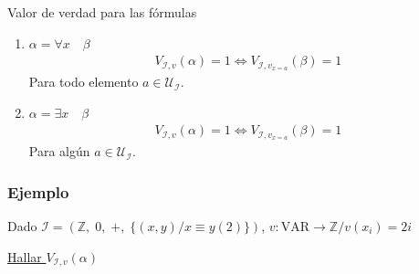 \begin{definicion}{Valor de verdad para las fórmulas}{}
\begin{enumerate}
    \item $\alpha = \forall x \quad \beta$
        \begin{gather*}
            V_{\mathcal{I}, v}(\alpha) = 1 \iff
            V_{\mathcal{I}, v_{x=a}}(\beta) = 1
        \end{gather*}
        Para todo elemento $a \in \mathcal{U}_{\mathcal{I}}$.

    \item $\alpha = \exists x \quad \beta$
        \begin{gather*}
            V_{\mathcal{I}, v}(\alpha) = 1 \iff
            V_{\mathcal{I}, v_{x=a}}(\beta) = 1
        \end{gather*}
        Para algún $a \in \mathcal{U}_{\mathcal{I}}$.
\end{enumerate}     
\end{definicion}


\subsubsection{Ejemplo}

Dado $\mathcal{I} = ( \mathbb{Z}, \;
    0 , \;
    + , \;
    \{ (x,y)/x \equiv y(2) \})$,
$v: \mathrm{VAR} \to \mathbb{Z} / v(x_i) = 2i$

\underline{Hallar $V_{\mathcal{I}, v} (\alpha)$ }

